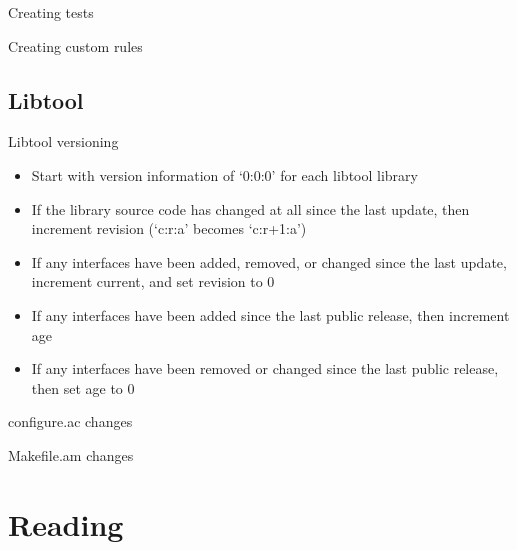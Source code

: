 \documentclass{beamer}
\begin{document}
\begin{frame}[t]{Creating tests}
    \begin{small}
    
    \end{small}
\end{frame}

\begin{frame}[t]{Creating custom rules}
    \begin{small}
    
    \end{small}
\end{frame}

\subsection{Libtool}

\begin{frame}{Libtool versioning}
    \begin{itemize}
    \item Start with version information of ‘0:0:0’ for each libtool library
    \item If the library source code has changed at all since the last update, then increment revision (‘c:r:a’ becomes ‘c:r+1:a’)
    \item If any interfaces have been added, removed, or changed since the last update, increment current, and set revision to 0
    \item If any interfaces have been added since the last public release, then increment age
    \item If any interfaces have been removed or changed since the last public release, then set age to 0
    \end{itemize}
\end{frame}

\begin{frame}[t]{configure.ac changes}
    \begin{small}
    
    \end{small}
\end{frame}

\begin{frame}[t]{Makefile.am changes}
    \begin{small}
    
    \end{small}
\end{frame}

\section{Reading}
\end{document}
